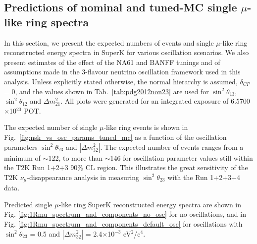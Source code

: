
\subsection {Predictions of nominal and tuned-MC single $\mu$-like ring spectra}
\label{sec:nominal_and_tuned_predictions}

In this section, we present the expected numbers of events and single $\mu$-like ring
reconstructed energy spectra in SuperK for various oscillation scenarios.
We also present estimates of the effect of the NA61 and BANFF tunings and of assumptions made in the 3-flavour
neutrino oscillation framework used in this analysis.
Unless explicitly stated otherwise, the normal hierarchy is assumed, $\delta_{CP}$ = 0,
and the values shown in Tab.\ \ref{tab:pdg2012non23}
are used for $\sin^{2}\theta_{13}$, $\sin^{2}\theta_{12}$ and $\Delta m^{2}_{21}$.
All plots were generated for an integrated exposure of 6.5700$\times$10$^{20}$ POT.

The expected number of single $\mu$-like ring events is shown in Fig.\ \ref{fig:nsk_vs_osc_params_tuned_mc}
as a function of the oscillation parameters $\sin^{2}{\theta_{23}}$ and $|\Delta m^{2}_{32}|$.
The expected number of events ranges from a minimum of $\sim$122,
to more than $\sim$146 for oscillation parameter values still within the T2K Run 1+2+3 90\% CL region.
This illustrates the great sensitivity of the T2K $\nu_{\mu}$-disappearance analysis in measuring $\sin^{2}{\theta_{23}}$
with the Run 1+2+3+4 data.

Predicted single $\mu$-like ring SuperK reconstructed energy spectra are shown in
Fig. \ref{fig:1Rmu_spectrum_and_components_no_osc} for no oscillations, and in
Fig. \ref{fig:1Rmu_spectrum_and_components_default_osc} for oscillations
with $\sin^{2}\theta_{23}$ = 0.5 and $|\Delta m^{2}_{32}|$ = 2.4$\times$10$^{-3}$ eV$^{2}$/c$^{4}$.

